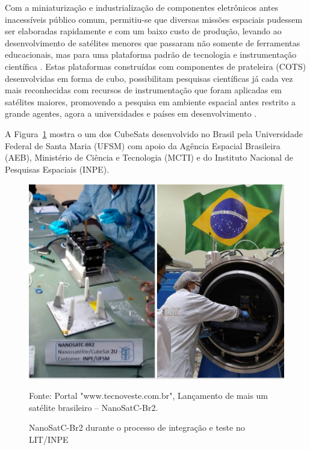Com a miniaturização e industrialização de componentes eletrônicos antes inacessíveis 
público comum, permitiu-se que diversas missões espaciais pudessem ser elaboradas rapidamente 
e com um baixo custo de produção, levando ao desenvolvimento de satélites menores que passaram 
não somente de ferramentas educacionais, mas para uma plataforma padrão de tecnologia e 
instrumentação científica \cite{Selva2012}. Estas plataformas construídas com componentes de 
prateleira (COTS) desenvolvidas em forma de cubo, possibilitam pesquisas científicas já cada 
vez mais reconhecidas com recursos de instrumentação que foram aplicadas em satélites maiores, 
promovendo a pesquisa em ambiente espacial antes restrito a grande agentes, agora a 
universidades e países em desenvolvimento \cite{Woellert2011}.


A Figura~\ref{fig: CubeSat NanoSatC-Br2} mostra o um dos CubeSats desenvolvido no Brasil pela Universidade 
Federal de Santa Maria (UFSM) com apoio da Agência Espacial Brasileira (AEB), Ministério de Ciência e 
Tecnologia (MCTI) e do Instituto Nacional de Pesquisas Espaciais (INPE).

\begin{figure}[H]
	\centering
	\includegraphics[width=15cm]{imagens/cubesat_brasil.jpg}
	\caption{NanoSatC-Br2 durante o processo de integração e teste no LIT/INPE}
	Fonte: Portal "www.tecnoveste.com.br", Lançamento de mais um satélite brasileiro – NanoSatC-Br2.
	\label{fig: CubeSat NanoSatC-Br2}
\end{figure}

